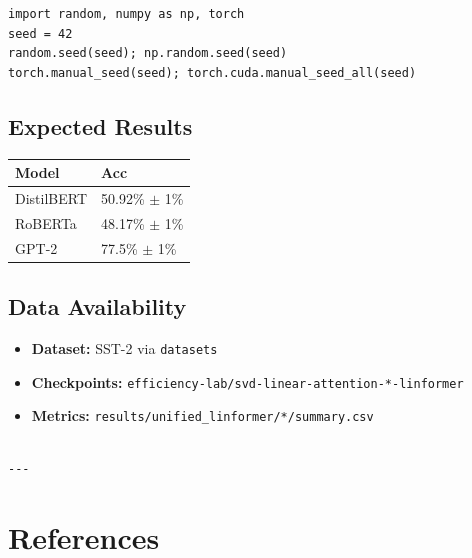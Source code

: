 \begin{lstlisting}
import random, numpy as np, torch
seed = 42
random.seed(seed); np.random.seed(seed)
torch.manual_seed(seed); torch.cuda.manual_seed_all(seed)
\end{lstlisting}

\subsection{Expected Results}

\begin{table}[H]
\centering
\small
\begin{tabular}{ll}
\toprule
\textbf{Model} & \textbf{Acc} \\
\midrule
DistilBERT & 50.92\% $\pm$ 1\% \\
RoBERTa & 48.17\% $\pm$ 1\% \\
GPT-2 & 77.5\% $\pm$ 1\% \\
\bottomrule
\end{tabular}
\end{table}

\subsection{Data Availability}

\begin{itemize}
\item \textbf{Dataset:} SST-2 via \texttt{datasets}
\item \textbf{Checkpoints:} \texttt{efficiency-lab/svd-linear-attention-*-linformer}
\item \textbf{Metrics:} \texttt{results/unified\_linformer/*/summary.csv}
\end{itemize}
\begin{lstlisting}

---
\end{lstlisting}

\section{References}

